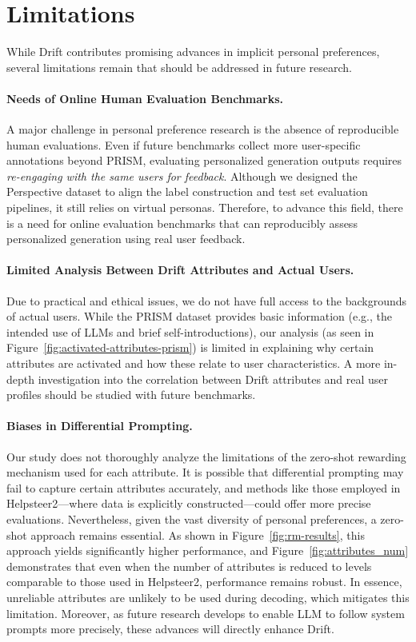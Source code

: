 
\section*{Limitations}

While Drift contributes promising advances in implicit personal preferences, several limitations remain that should be addressed in future research.

\paragraph{Needs of Online Human Evaluation Benchmarks.}  
A major challenge in personal preference research is the absence of reproducible human evaluations. Even if future benchmarks collect more user-specific annotations beyond PRISM, evaluating personalized generation outputs requires \textit{re-engaging with the same users for feedback}. Although we designed the Perspective dataset to align the label construction and test set evaluation pipelines, it still relies on virtual personas. Therefore, to advance this field, there is a need for online evaluation benchmarks that can reproducibly assess personalized generation using real user feedback.

\paragraph{Limited Analysis Between Drift Attributes and Actual Users.}  
Due to practical and ethical issues, we do not have full access to the backgrounds of actual users. While the PRISM dataset provides basic information (e.g., the intended use of LLMs and brief self-introductions), our analysis (as seen in Figure~\ref{fig:activated-attributes-prism}) is limited in explaining why certain attributes are activated and how these relate to user characteristics. A more in-depth investigation into the correlation between Drift attributes and real user profiles should be studied with future benchmarks.

\paragraph{Biases in Differential Prompting.}  
Our study does not thoroughly analyze the limitations of the zero-shot rewarding mechanism used for each attribute. It is possible that differential prompting may fail to capture certain attributes accurately, and methods like those employed in Helpsteer2—where data is explicitly constructed—could offer more precise evaluations. Nevertheless, given the vast diversity of personal preferences, a zero-shot approach remains essential. As shown in Figure~\ref{fig:rm-results}, this approach yields significantly higher performance, and Figure~\ref{fig:attributes_num} demonstrates that even when the number of attributes is reduced to levels comparable to those used in Helpsteer2, performance remains robust. In essence, unreliable attributes are unlikely to be used during decoding, which mitigates this limitation. Moreover, as future research develops to enable LLM to follow system prompts more precisely, these advances will directly enhance Drift.

